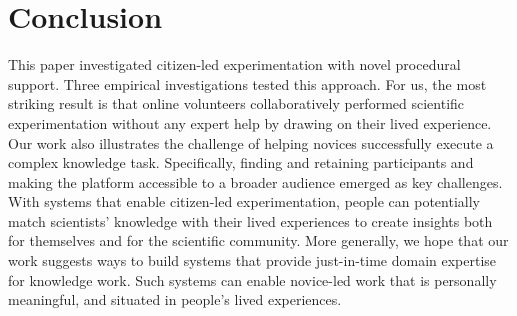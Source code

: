\section{Conclusion}
This paper investigated citizen-led experimentation with novel procedural support. Three empirical investigations tested this approach. For us, the most striking result is that online volunteers collaboratively performed scientific experimentation without any expert help by drawing on their lived experience. Our work also illustrates the challenge of helping novices successfully execute a complex knowledge task. Specifically, finding and retaining participants and making the platform accessible to a broader audience emerged as key challenges. With systems that enable citizen-led experimentation, people can potentially match scientists' knowledge with their lived experiences to create insights both for themselves and for the scientific community. More generally, we hope that our work suggests ways to build systems that provide just-in-time domain expertise for knowledge work. Such systems can enable novice-led work that is personally meaningful, and situated in people's lived experiences.
